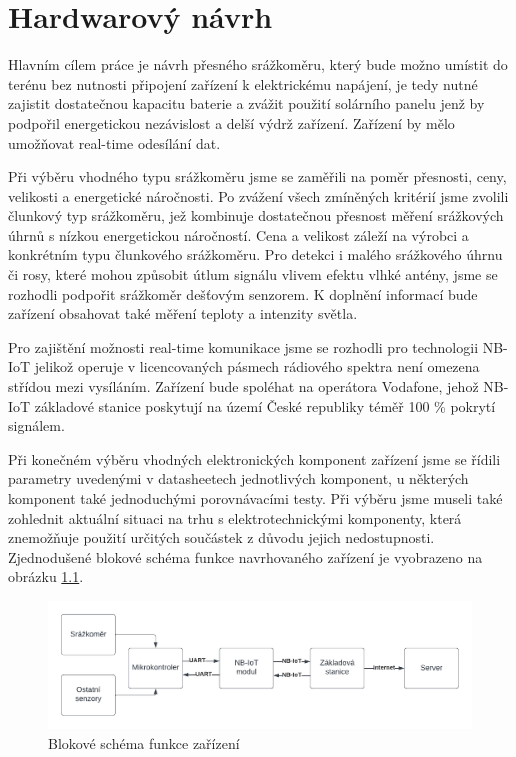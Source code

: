 \chapter{Hardwarový návrh}
\par Hlavním cílem práce je návrh přesného srážkoměru, který bude možno umístit do terénu bez nutnosti připojení zařízení k elektrickému napájení, je tedy nutné zajistit dostatečnou kapacitu baterie a zvážit použití solárního panelu jenž by podpořil energetickou nezávislost a delší výdrž zařízení. Zařízení by mělo umožňovat real-time odesílání dat.
\par Při výběru vhodného typu srážkoměru jsme se zaměřili na poměr přesnosti, ceny, velikosti a energetické náročnosti. Po zvážení všech zmíněných kritérií jsme zvolili člunkový typ srážkoměru, jež kombinuje dostatečnou přesnost měření srážkových úhrnů s nízkou energetickou náročností. Cena a velikost záleží na výrobci a konkrétním typu člunkového srážkoměru. Pro detekci i malého srážkového úhrnu či rosy, které mohou způsobit útlum signálu vlivem efektu vlhké antény, jsme se rozhodli podpořit srážkoměr dešťovým senzorem. K doplnění informací bude zařízení obsahovat také měření teploty a intenzity světla.
\par Pro zajištění možnosti real-time komunikace jsme se rozhodli pro technologii NB-IoT jelikož operuje v licencovaných pásmech rádiového spektra není omezena střídou mezi vysíláním. Zařízení bude spoléhat na operátora Vodafone, jehož NB-IoT základové stanice poskytují na území České republiky téměř 100 \% pokrytí signálem.
\par Při konečném výběru vhodných elektronických komponent zařízení jsme se řídili parametry uvedenými v datasheetech jednotlivých komponent, u některých komponent také jednoduchými porovnávacími testy. Při výběru jsme museli také zohlednit aktuální situaci na trhu s elektrotechnickými komponenty, která znemožňuje použití určitých součástek z důvodu jejich nedostupnosti. Zjednodušené blokové schéma funkce navrhovaného zařízení je vyobrazeno na obrázku \ref{obr:HardwareBlock}.
    \begin{figure}[!h]
      \begin{center}
        \includegraphics[scale=0.7]{obrazky/prace/HardwareDiagram.pdf}
      \end{center}
      \caption[Blokové schéma - Hardware]{Blokové schéma funkce zařízení}
      \label{obr:HardwareBlock}
    \end{figure}

